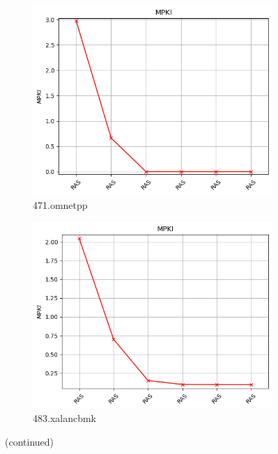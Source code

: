 \documentclass{article}
\begin{document}
\begin{figure}[H]
    \centering
    \ContinuedFloat

    \begin{subfigure}[b]{0.45\textwidth}
        \includegraphics[width=\textwidth]{figures/5_5/471.omnetpp.cslab_branch_preds_ref.out.png}
        \caption{471.omnetpp}
        \label{fig:plot79}
    \end{subfigure}
    \hfill
    \begin{subfigure}[b]{0.45\textwidth}
        \includegraphics[width=\textwidth]{figures/5_5/483.xalancbmk.cslab_branch_preds_ref.out.png}
        \caption{483.xalancbmk}
        \label{fig:plot80}
    \end{subfigure}

    \vspace{0.5cm} %
    \caption{(continued)}
    \label{fig:ras_part4}
\end{figure}
\end{document}

